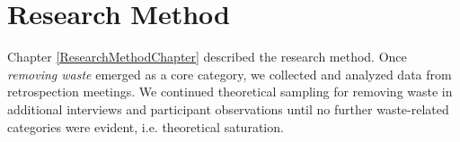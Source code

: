 

\section{Research Method}
\label{WasteResearchMethod}

Chapter \ref{ResearchMethodChapter} described the research method. Once \textit{removing waste} emerged as a core category, we collected and analyzed data from retrospection meetings. We continued theoretical sampling for removing waste in additional interviews and participant observations until no further waste-related categories were evident, i.e. theoretical saturation. 



